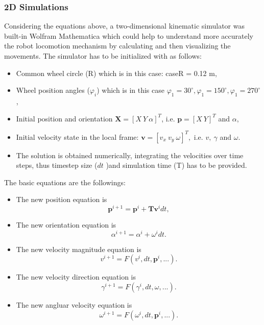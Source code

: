 \documentclass[12pt,english]{article}
\begin{document}
\subsubsection{2D Simulations}
Considering the equations above, a two-dimensional kinematic simulator was built-in Wolfram Mathematica which could help to understand more accurately the robot locomotion mechanism by calculating and then visualizing the movements. The simulator has to be initialized with as follows:
\begin{itemize}
	\item Common wheel circle (R) which is in this case: caseR = 0.12 m,
	\item Wheel position angles ($\varphi_i$) which is in this case $\varphi_1=30^{\circ}, \varphi_1=150^{\circ},\varphi_1=270^{\circ}$,
	\item Initial position and orientation $\mathbf{X} = [X~Y~\alpha]^T$, i.e. $\mathbf{p}=[X~Y]^T$ and $\alpha$,
	\item Initial velocity state in the local frame: $\mathbf{v} = [v_x~v_y~\omega]^T,$ i.e. $v,~\gamma$ and $\omega$.
	\item The solution is obtained numerically, integrating the velocities over time steps, thus timestep size ($dt$ )and simulation time (T) has to be provided.
\end{itemize}
The basic equations are the followings:
\begin{itemize}
	\item The new position equation is
	\begin{equation}
		\mathbf{p}^{i+1} = \mathbf{p}^{i} + \mathbf{T} \mathbf{v}^i dt,
	\end{equation}
	\item The new orientation equation is
	\begin{equation}
		\alpha^{i+1} = \alpha^{i} + \omega^i dt.
	\end{equation}
	\item The new velocity magnitude equation is
	\begin{equation}
		v^{i+1} = F(v^{i},dt,\mathbf{p}^{i},...).
	\end{equation}
	\item The new velocity direction equation is
	\begin{equation}
		\gamma^{i+1} = F(\gamma^{i},dt,\omega,...).
	\end{equation}
	\item The new angluar velocity equation is
	\begin{equation}
	\omega^{i+1} = F(\omega^{i},dt,\mathbf{p}^{i},...).
	\end{equation}
\end{itemize}
\end{document}
